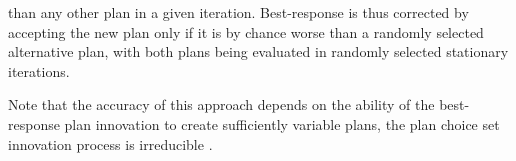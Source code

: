%
%
than any other plan in a given iteration. Best-response is
thus corrected  by accepting the new plan\corr{,}{} only if it
is\corr{,}{} by chance\corr{,}{} worse than a randomly selected alternative plan, with both plans being
evaluated in randomly selected stationary iterations.

Note that the accuracy 
of this approach depends on the ability
of the best-response plan innovation to create sufficiently variable plans, 
%
%
 the plan choice set innovation process
is irreducible \citep[][see also
Section~\ref{sec:Existence-and-uniqueness} for an intuitive definition of
irreducibility]{ross-2006}.

%
%
%
%

%

